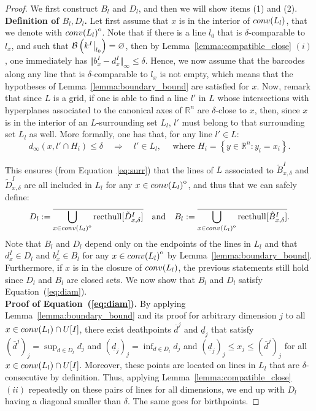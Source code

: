 \documentclass{article}
\newcommand{\field}{k}
\newcommand{\barcode}[1]{ {\mathcal B}\left(#1\right) }
\newcommand{\conv}[1]{ {\rm conv}(#1) }
\newcommand{\induced}[1]{\field^{#1}}
\newcommand{\R}{\mathbb{R}}
\newcommand{\interior}[1]{{\kern0pt#1}^{\mathrm{o}}}
\newcommand\restr[2]{{  \left.\kern-\nulldelimiterspace #1 \vphantom{\big|} \right|_{#2}  }}
\begin{document}
\begin{proof} We first construct $B_l$ and $D_l$, and then we will show items (1) and (2). \\

	{\bf Definition of $B_l,D_l$.}
	Let first assume that $x$ is in the interior of $ \conv{L_l}$, that we denote with $\interior{\conv{L_l}}$.
	Note that if there is a line $l_0$ that is $\delta$-comparable to $l_x$, and such that $\barcode{\restr{\induced{I}}{l_0}} = \varnothing$,  %
	then by Lemma~\ref{lemma:compatible_close} $(i)$, one immediately has $\Vert b_x^I - d_x^I \Vert_{\infty} \le \delta$.
	Hence, we now assume that the barcodes along any %
	line that is $\delta$-comparable to $l_x$ is not empty,
	which means that the hypotheses
	of Lemma~\ref{lemma:boundary_bound} are satisfied for $x$.
	Now, remark that since $L$ is a grid, if one is able to find a line $l'$ in $L$ whose intersections
	with hyperplanes associated to the canonical axes of $\R^n$ are $\delta$-close to $x$, then, since $x$
	is in the interior of an $L$-surrounding set $L_l$, $l'$ must belong to that surrounding set $L_l$ as well. More formally,
	one has that, for any line $l'\in L$:
	\begin{equation*}
		d_{\infty}(x, l'\cap H_i)\le \delta \quad\Longrightarrow\quad l' \in L_l,
		\quad
		\text{ where }
		H_i = \left\{ y \in \R^n : y_i = x_i\right\}.
	\end{equation*}

	This ensures (from Equation~\ref{eq:surr}) that the lines of $L$ associated to $\tilde B^I_{x,\delta}$ and  $\tilde D^I_{x,\delta}$
	are all included in $L_l$ for any $x\in\interior{\conv{L_l}}$, and thus that we can safely define:
	\begin{equation*}
		D_l := \overline{\bigcup_{x \in \interior{\conv{L_l}}}\mathrm{ recthull}[\tilde D_{x,\delta}^I]}
		\quad \text{and} \quad
		B_l := \overline{\bigcup_{x \in \interior{\conv{L_l}}}\mathrm{ recthull}[\tilde B_{x,\delta}^I] }.
	\end{equation*}
	Note that $B_l$ and $D_l$ depend only on the endpoints of the lines in $L_l$ %
	and that $d_x^I \in D_l$ and $b_x^I \in B_l$ for any $x\in \interior{\conv{L_l}}$ by Lemma~\ref{lemma:boundary_bound}.
	Furthermore, if $x$ is in the closure of $\conv{L_l}$, the previous statements still hold
	since $D_l$ and $B_l$ are closed sets.
	We now show that $B_l$ and $D_l$ satisfy Equation~(\ref{eq:diam}). \\

	{\bf Proof of Equation~(\ref{eq:diam}). } By applying
	Lemma~\ref{lemma:boundary_bound} and its proof for arbitrary dimension $j$ to all $x\in\conv{L_l}\cap U[I]$, %
	there exist deathpoints $\overline d^j$ and $\underline d_j$
	that satisfy $(\overline d^j)_j = \sup_{d\in D_l} d_j$ and $(\underline d_j)_j = \inf_{d\in D_l} d_j$ and $(\underline d_j)_j \le x_j \le (\overline d^j)_j$ for all $x\in\conv{L_l}\cap U[I]$.
	Moreover, these points are located on lines in $L_l$
	that are $\delta$-consecutive by definition.
	Thus, applying Lemma~\ref{lemma:compatible_close} $(ii)$ repeatedly on these
	pairs of lines for all dimensions, we end up with $D_l$ having a diagonal smaller than $\delta$. The same goes for birthpoints. %
\end{proof}
\end{document}
